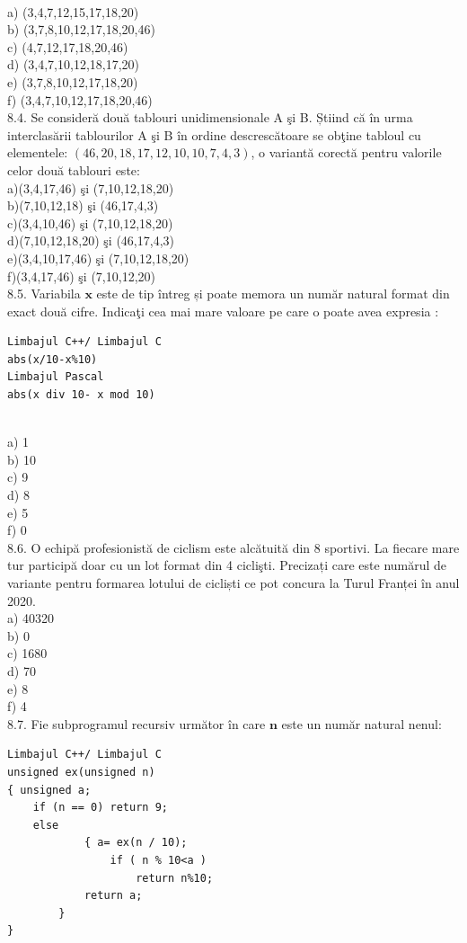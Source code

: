 \\
a) (3,4,7,12,15,17,18,20)
\\
b) (3,7,8,10,12,17,18,20,46)
\\
c) (4,7,12,17,18,20,46)
\\
d) (3,4,7,10,12,18,17,20)
\\ 
e) (3,7,8,10,12,17,18,20)
\\
f) (3,4,7,10,12,17,18,20,46)
\\
8.4. Se consideră două tablouri unidimensionale A şi B. Știind că în urma interclasării tablourilor A şi B în ordine descrescătoare se obţine tabloul cu elementele: $(46,20,18,17,12,10,10,7,4,3)$, o variantă corectă pentru valorile celor două tablouri este:
\\
a)(3,4,17,46) şi (7,10,12,18,20)
\\
b)(7,10,12,18) şi (46,17,4,3)
\\
c)(3,4,10,46) şi (7,10,12,18,20)
\\
d)(7,10,12,18,20) şi (46,17,4,3)
\\
e)(3,4,10,17,46) şi (7,10,12,18,20)
\\
f)(3,4,17,46) şi (7,10,12,20)
\\
8.5. Variabila $\mathbf{x}$ este de tip întreg și poate memora un număr natural format din exact două cifre. Indicaţi cea mai mare valoare pe care o poate avea expresia :
\begin{verbatim}
Limbajul C++/ Limbajul C
abs(x/10-x%10)
Limbajul Pascal
abs(x div 10- x mod 10)
\end{verbatim}
\\
a) 1
\\
b) 10
\\
c) 9
\\
d) 8
\\
e) 5
\\
f) 0
\\
8.6. O echipă profesionistă de ciclism este alcătuită din 8 sportivi. La fiecare mare tur participă doar cu un lot format din 4 ciclişti. Precizați care este numărul de variante pentru formarea lotului de cicliști ce pot concura la Turul Franței în anul 2020.
\\
a) 40320
\\
b) 0
\\
c) 1680
\\
d) 70
\\
e) 8
\\
f) 4
\\
8.7. Fie subprogramul recursiv următor în care $\mathbf{n}$ este un număr natural nenul:
\begin{verbatim}
Limbajul C++/ Limbajul C
unsigned ex(unsigned n)
{ unsigned a;
    if (n == 0) return 9;
    else
            { a= ex(n / 10);
                if ( n % 10<a )
                    return n%10;
            return a;
        }
}
\end{verbatim}
